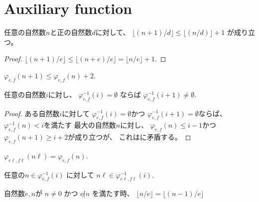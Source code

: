 \chapter{Auxiliary function}

\begin{lemma}
\label{lm:nat_succ_div_le}
\leanok
任意の自然数$n$と正の自然数$d$に対して、
$
\lfloor (n+1)/d \rfloor
\le
\lfloor (n/d) \rfloor + 1
$
が成り立つ。
\end{lemma}

\begin{proof}
$
\lfloor (n+1)/e \rfloor
\le
\lfloor (n+e)/e \rfloor
=
\lfloor n/e \rfloor + 1
$.
\end{proof}

\begin{lemma}
\label{lm:φ_n_add_one_le_φ_n_add_two}
\leanok
$\varphi_{e,f}(n+1) \le \varphi_{e,f}(n) + 2$.
\end{lemma}

\begin{lemma}
\label{lm:φinv_i_empty_implies_φinv_i_add_one_nonempty}
\leanok
任意の自然数$i$に対し、
$\varphi_{e,f}^{-1}(i) = \emptyset$
ならば
$\varphi_{e,f}^{-1}(i+1) \ne \emptyset$.
\end{lemma}

\begin{proof}
ある自然数$i$に対して
$\varphi_{e,f}^{-1}(i) = \emptyset$かつ
$\varphi_{e,f}^{-1}(i+1) = \emptyset$ならば、
$\varphi_{e,f}^{-1}(n) < i$を満たす
最大の自然数$n$に対し、
$\varphi_{e,f}(n) \le i-1$かつ
$\varphi_{e,f}(n+1) \ge i+2$が成り立つが、
これはに矛盾する。
\end{proof}

\begin{lemma}
\label{lm:φ_mul}
\leanok
$\varphi_{e \ell, f \ell}(n \ell) = \varphi_{e,f}(n)$.
\end{lemma}

\begin{lemma}
任意の$n \in \varphi_{e,f}^{-1}(i)$
に対して
$n \ell \in \varphi_{e \ell,f \ell}^{-1}(i)$.
\end{lemma}

\begin{lemma}
\label{lm:not_dvd_mod_eq}
\leanok
自然数$e,n$が
$n \ne 0$
かつ
$e \not | n$
を満たす時、
$\lfloor n / e \rfloor = \lfloor (n-1) / e \rfloor$
\end{lemma}

